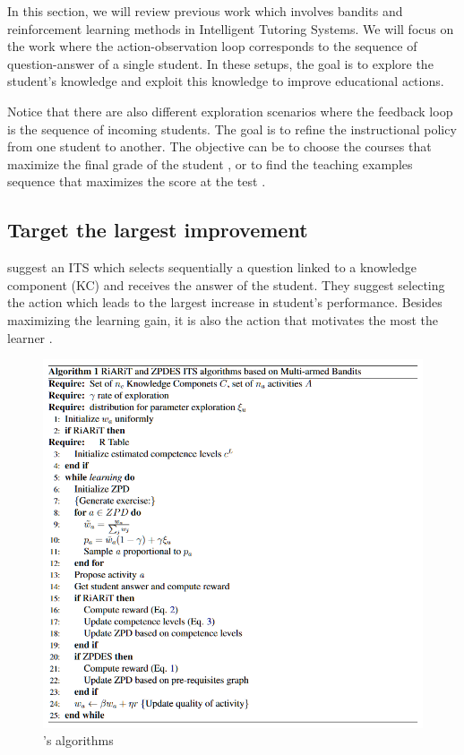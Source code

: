 In this section, we will review previous work which involves bandits and reinforcement learning methods in Intelligent Tutoring Systems.  We will focus on the work where the action-observation loop corresponds to the sequence of question-answer of a single student. In these setups, the goal is to explore the student's knowledge and exploit this knowledge to improve educational actions.

Notice that there are also different exploration scenarios where the feedback loop is the sequence of incoming students. The goal is to refine the instructional policy from one student to another. The objective can be to choose the courses that maximize the final grade of the student \citep{xu2016personalized, lan2016contextual}, or to find the teaching examples sequence that maximizes the score at the test \citep{lindsey2013optimizing}.

\subsection{Target the largest improvement}
\citet{clement2015multi} suggest an ITS which selects sequentially a question linked to a knowledge component (KC) and receives the answer of the student. They suggest selecting the action which leads to the largest increase in student's performance. Besides maximizing the learning gain, it is also the action that motivates the most the learner \citep{gottlieb2013information}. 

\begin{figure}[h]
\begin{center}
\includegraphics[scale=1]{fig/2Litterature_uncompressed/lopes-alg.png}
\end{center}
\caption{\citet{clement2015multi}'s algorithms}
\label{alg:clement}
\end{figure}

